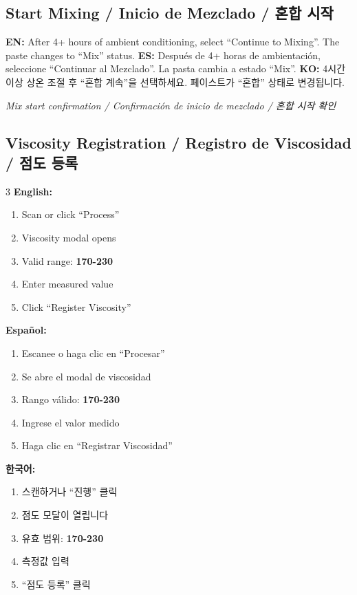 \documentclass[12pt,a4paper]{article}
\newcommand{\tri}[3]{%
  \textbf{EN:} #1 \quad\textbar\quad \textbf{ES:} #2 \quad\textbar\quad \textbf{KO:} #3%
}
\begin{document}
\subsection{Start Mixing / Inicio de Mezclado / 혼합 시작}

\tri{After 4+ hours of ambient conditioning, select ``Continue to Mixing''. The paste changes to ``Mix'' status.}
{Después de 4+ horas de ambientación, seleccione ``Continuar al Mezclado''. La pasta cambia a estado ``Mix''.}
{4시간 이상 상온 조절 후 ``혼합 계속''을 선택하세요. 페이스트가 ``혼합'' 상태로 변경됩니다.}

\begin{photobox}
\centering
\vspace{3cm}
\textit{Mix start confirmation / Confirmación de inicio de mezclado / 혼합 시작 확인}
\vspace{0.5cm}
\end{photobox}

\subsection{Viscosity Registration / Registro de Viscosidad / 점도 등록}

\begin{multicols}{3}
\textbf{English:}
\begin{enumerate}[leftmargin=*]
\item Scan or click ``Process''
\item Viscosity modal opens
\item Valid range: \textbf{170-230}
\item Enter measured value
\item Click ``Register Viscosity''
\end{enumerate}

\columnbreak
\textbf{Español:}
\begin{enumerate}[leftmargin=*]
\item Escanee o haga clic en ``Procesar''
\item Se abre el modal de viscosidad
\item Rango válido: \textbf{170-230}
\item Ingrese el valor medido
\item Haga clic en ``Registrar Viscosidad''
\end{enumerate}

\columnbreak
\textbf{한국어:}
\begin{enumerate}[leftmargin=*]
\item 스캔하거나 ``진행'' 클릭
\item 점도 모달이 열립니다
\item 유효 범위: \textbf{170-230}
\item 측정값 입력
\item ``점도 등록'' 클릭
\end{enumerate}
\end{multicols}
\end{document}

